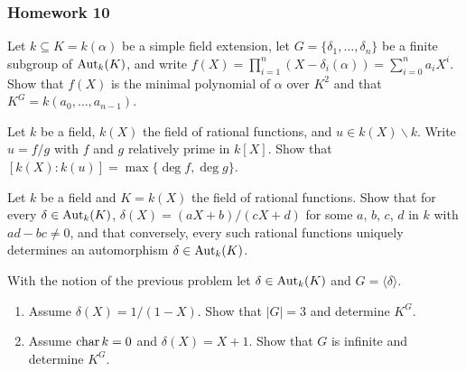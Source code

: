 \subsubsection{Homework 10}
\setcounter{exercise}{0}

\begin{problem}
  Let $k\subseteq K=k(\alpha)$ be a simple field extension, let
  $G=\{\delta_1,\dotsc,\delta_n\}$ be a finite subgroup of
  $\operatorname{Aut}_k(K)$, and write
  $f(X)=\prod_{i=1}^n(X-\delta_i(\alpha))=\sum_{i=0}^na_iX^i$. Show
  that $f(X)$ is the minimal polynomial of $\alpha$ over $K^2$ and that
  $K^G=k(a_0,\dotsc,a_{n-1})$.
\end{problem}
\begin{solution}
\end{solution}

\begin{problem}
  Let $k$ be a field, $k(X)$ the field of rational functions, and
  $u\in k(X)\smallsetminus k$. Write $u= f/g$ with $f$ and $g$
  relatively prime in $k[X]$. Show that
  $[k(X):k(u)]=\max\{\deg f,\deg g\}$.
\end{problem}
\begin{solution}
\end{solution}

\begin{problem}
  Let $k$ be a field and $K= k(X)$ the field of rational
  functions. Show that for every $\delta\in\operatorname{Aut}_k(K)$,
  $\delta(X)= (aX+b)/(cX+d)$ for some $a$, $b$, $c$, $d$ in $k$ with
  $ad-bc\neq 0$, and that conversely, every such rational functions
  uniquely determines an automorphism $\delta\in\operatorname{Aut}_k(K)$.
\end{problem}
\begin{solution}
\end{solution}

\begin{problem}
With the notion of the previous problem let $\delta\in\operatorname{Aut}_k(K)$ and
$G=\langle \delta \rangle$.
\begin{enumerate}[label=(\alph*),noitemsep]
\item Assume $\delta(X)=1/(1-X)$. Show that $|G|=3$ and determine $K^G$.
\item Assume $\operatorname{char} k=0$ and $\delta(X)=X+1$. Show that $G$ is infinite and
  determine $K^G$.
\end{enumerate}
\end{problem}
\begin{solution}
\end{solution}

